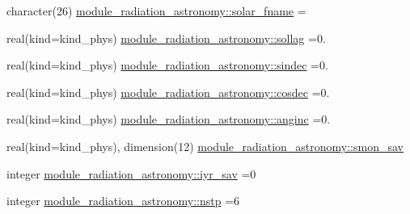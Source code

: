\begin{DoxyCompactItemize}
character(26) \hyperlink{group__module__radiation__astronomy_ga05ee7e378d38b90242738b9bf6c40c00}{module\+\_\+radiation\+\_\+astronomy\+::solar\+\_\+fname} = \textquotesingle{} \textquotesingle{}
\item 
real(kind=kind\+\_\+phys) \hyperlink{group__module__radiation__astronomy_ga264a011aa71fb670339ac555dc24e486}{module\+\_\+radiation\+\_\+astronomy\+::sollag} =0.
\item 
real(kind=kind\+\_\+phys) \hyperlink{group__module__radiation__astronomy_gae195d9c834e2789170f89c988d28b01e}{module\+\_\+radiation\+\_\+astronomy\+::sindec} =0.
\item 
real(kind=kind\+\_\+phys) \hyperlink{group__module__radiation__astronomy_ga07386e90045639b8023abd826e0e2768}{module\+\_\+radiation\+\_\+astronomy\+::cosdec} =0.
\item 
real(kind=kind\+\_\+phys) \hyperlink{group__module__radiation__astronomy_ga723159a44491e4ae974128123a1e8dcd}{module\+\_\+radiation\+\_\+astronomy\+::anginc} =0.
\item 
real(kind=kind\+\_\+phys), dimension(12) \hyperlink{group__module__radiation__astronomy_gab68b4488022a4c6340cb60dca3feff6a}{module\+\_\+radiation\+\_\+astronomy\+::smon\+\_\+sav}
\item 
integer \hyperlink{group__module__radiation__astronomy_ga83370fbee96388e545a89eb25ed6df90}{module\+\_\+radiation\+\_\+astronomy\+::iyr\+\_\+sav} =0
\item 
integer \hyperlink{group__module__radiation__astronomy_gab93fe36440da3cc1f1d64cae2ec4c25b}{module\+\_\+radiation\+\_\+astronomy\+::nstp} =6
\end{DoxyCompactItemize}
